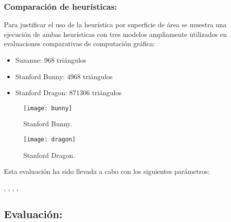 	
\subsubsection{Comparación de heurísticas:}
	
Para justificar el uso de la heurística por superficie de área se muestra una ejecución de ambas heurísticas con tres modelos ampliamente utilizados en evaluaciones comparativas de computación gráfica:

\begin{itemize}
	
	\item Suzanne: 968 triángulos
	\item Stanford Bunny: 4968 triángulos
	\item Stanford Dragon: 871306 triángulos
	
\end{itemize}

\begin{figure}[H]
	\centering
  \begin{minipage}[b]{0.4\textwidth}
    \texttt{[image: bunny]}
    \caption{Stanford Bunny.}
  \end{minipage}
  \hfill
  \begin{minipage}[b]{0.4\textwidth}
    \texttt{[image: dragon]}
    \caption{Stanford Dragon.}
  \end{minipage}
\end{figure}

Esta evaluación ha sido llevada a cabo con los siguientes parámetros:

, , , , 

	

	
\subsection{Evaluación:}
	
